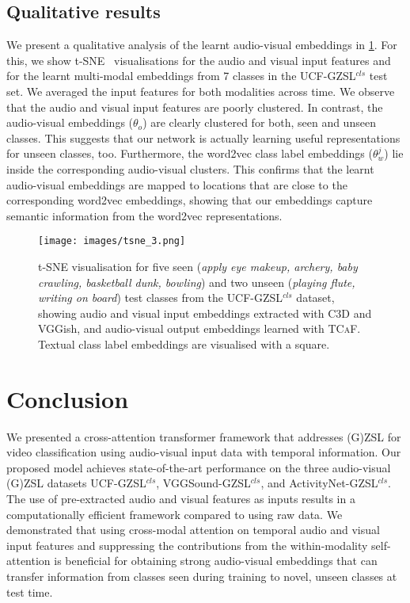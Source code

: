 \documentclass[runningheads]{llncs}
\newcommand{\modelName}{\textsc{TCaF}\xspace}
\newcommand{\activity}{{ActivityNet-GZSL$^{cls}$}\xspace}
\newcommand{\ucf}{{UCF-GZSL$^{cls}$}\xspace}
\newcommand{\vgg}{{VGGSound-GZSL$^{cls}$}\xspace}
\begin{document}
\subsection{Qualitative results}\label{sec:qualitative}
We present a qualitative analysis of the learnt audio-visual embeddings in \cref{fig:qualitative_results_ucf}. For this, we show t-SNE~\cite{van2008visualizing} visualisations for the audio and visual input features and for the learnt multi-modal embeddings from 7 classes in the \ucf test set. We averaged the input features for both modalities across time. We observe that the audio and visual input features are poorly clustered.
In contrast, the audio-visual embeddings ($\theta_o$) are clearly clustered for both, seen and unseen classes. This suggests that our network is actually learning useful representations for unseen classes, too.
Furthermore, the word2vec class label embeddings ($\theta_w^j$) lie inside the corresponding audio-visual clusters. This confirms that the learnt audio-visual embeddings are mapped to locations that are close to the corresponding word2vec embeddings, showing that our embeddings capture semantic information from the word2vec representations.


 \begin{figure}[t]
     \centering
\texttt{[image: images/tsne\_3.png]}
\caption{t-SNE visualisation for five seen (\textit{apply eye makeup, archery, baby crawling, basketball dunk, bowling}) and two unseen (\textit{playing flute, writing on board}) test classes from the \ucf dataset, showing audio and visual input embeddings extracted with C3D and VGGish, and audio-visual output embeddings learned with \modelName. Textual class label embeddings are visualised with a square.
        }
        \label{fig:qualitative_results_ucf}
\end{figure}

\section{Conclusion}
We presented a cross-attention transformer framework that addresses (G)ZSL for video classification using audio-visual input data with temporal information. Our proposed model achieves state-of-the-art performance on the three audio-visual (G)ZSL datasets \ucf, \vgg, and \activity. The use of pre-extracted audio and visual features as inputs results in a computationally efficient framework compared to using raw data. We demonstrated that using cross-modal attention on temporal audio and visual input features and suppressing the contributions from the within-modality self-attention is beneficial for obtaining strong audio-visual embeddings that can transfer information from classes seen during training to novel, unseen classes at test time. 
\end{document}
